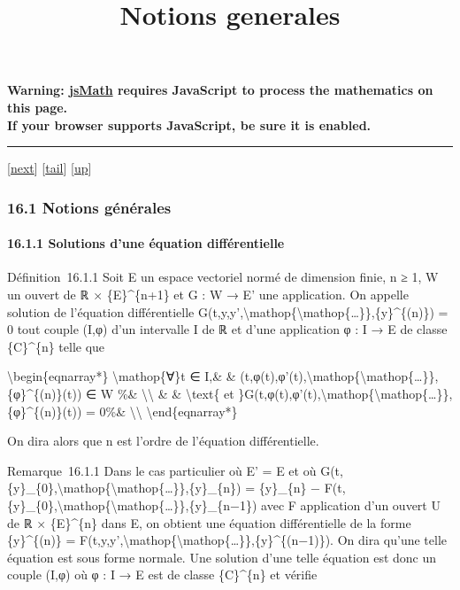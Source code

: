 \documentclass[]{article}
\title{Notions generales}
\author{}
\date{}
\begin{document}
\maketitle

\textbf{Warning: \href{http://www.math.union.edu/locate/jsMath}{jsMath}
requires JavaScript to process the mathematics on this page.\\ If your
browser supports JavaScript, be sure it is enabled.}

\begin{center}\rule{3in}{0.4pt}\end{center}

{[}\href{coursse87.html}{next}{]}
{[}\hyperref[tailcoursse86.html]{tail}{]}
{[}\href{coursch17.html\#coursse86.html}{up}{]}

\subsubsection{16.1 Notions générales}

\paragraph{16.1.1 Solutions d'une équation différentielle}

Définition~16.1.1 Soit E un espace vectoriel normé de dimension finie, n
≥ 1, W un ouvert de ℝ × \{E\}\^{}\{n+1\} et G : W → E' une application.
On appelle solution de l'équation différentielle
G(t,y,y',\textbackslash{}mathop\{\textbackslash{}mathop\{\ldots{}\}\},\{y\}\^{}\{(n)\})
= 0 tout couple (I,φ) d'un intervalle I de ℝ et d'une application φ : I
→ E de classe \{C\}\^{}\{n\} telle que

\textbackslash{}begin\{eqnarray*\} \textbackslash{}mathop\{∀\}t ∈ I,\&
\&
(t,φ(t),φ'(t),\textbackslash{}mathop\{\textbackslash{}mathop\{\ldots{}\}\},\{φ\}\^{}\{(n)\}(t))
∈ W \%\& \textbackslash{}\textbackslash{} \& \& \textbackslash{}text\{
et
\}G(t,φ(t),φ'(t),\textbackslash{}mathop\{\textbackslash{}mathop\{\ldots{}\}\},\{φ\}\^{}\{(n)\}(t))
= 0\%\& \textbackslash{}\textbackslash{}
\textbackslash{}end\{eqnarray*\}

On dira alors que n est l'ordre de l'équation différentielle.

Remarque~16.1.1 Dans le cas particulier où E' = E et où
G(t,\{y\}\_\{0\},\textbackslash{}mathop\{\textbackslash{}mathop\{\ldots{}\}\},\{y\}\_\{n\})
= \{y\}\_\{n\} −
F(t,\{y\}\_\{0\},\textbackslash{}mathop\{\textbackslash{}mathop\{\ldots{}\}\},\{y\}\_\{n−1\})
avec F application d'un ouvert U de ℝ × \{E\}\^{}\{n\} dans E, on
obtient une équation différentielle de la forme \{y\}\^{}\{(n)\} =
F(t,y,y',\textbackslash{}mathop\{\textbackslash{}mathop\{\ldots{}\}\},\{y\}\^{}\{(n−1)\}).
On dira qu'une telle équation est sous forme normale. Une solution d'une
telle équation est donc un couple (I,φ) où φ : I → E est de classe
\{C\}\^{}\{n\} et vérifie
\end{document}

